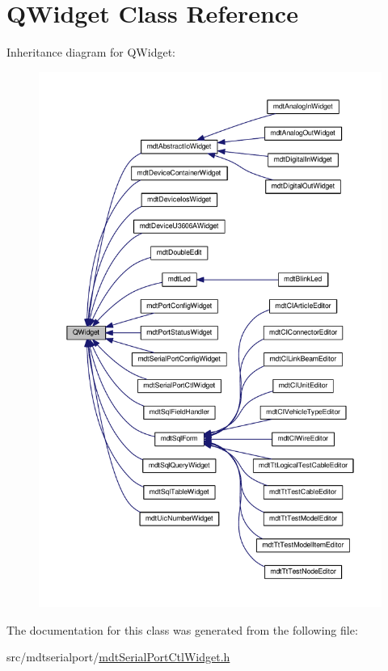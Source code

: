 \hypertarget{class_q_widget}{\section{Q\-Widget Class Reference}
\label{class_q_widget}
}


Inheritance diagram for Q\-Widget\-:
\nopagebreak
\begin{figure}[H]
\begin{center}
\leavevmode
\includegraphics[width=350pt]{class_q_widget__inherit__graph}
\end{center}
\end{figure}


The documentation for this class was generated from the following file\-:\begin{DoxyCompactItemize}
\item 
src/mdtserialport/\hyperlink{mdt_serial_port_ctl_widget_8h}{mdt\-Serial\-Port\-Ctl\-Widget.\-h}\end{DoxyCompactItemize}
